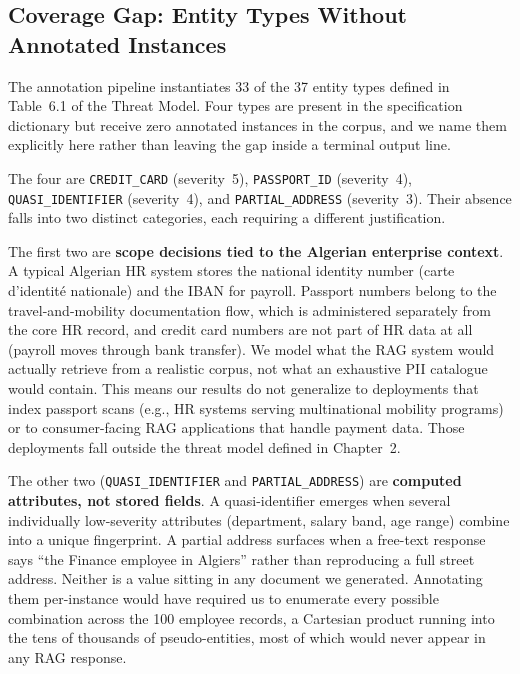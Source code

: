 \documentclass[12pt, a4paper]{report}
\begin{document}
\subsection{Coverage Gap: Entity Types Without Annotated Instances}
\label{subsec:coverage-gap}

The annotation pipeline instantiates 33 of the 37 entity types defined in Table~6.1 of the Threat Model. Four types are present in the specification dictionary but receive zero annotated instances in the corpus, and we name them explicitly here rather than leaving the gap inside a terminal output line.

The four are \texttt{CREDIT\_CARD} (severity~5), \texttt{PASSPORT\_ID} (severity~4), \texttt{QUASI\_IDENTIFIER} (severity~4), and \texttt{PARTIAL\_ADDRESS} (severity~3). Their absence falls into two distinct categories, each requiring a different justification.

The first two are \textbf{scope decisions tied to the Algerian enterprise context}. A typical Algerian HR system stores the national identity number (carte d'identité nationale) and the IBAN for payroll. Passport numbers belong to the travel-and-mobility documentation flow, which is administered separately from the core HR record, and credit card numbers are not part of HR data at all (payroll moves through bank transfer). We model what the RAG system would actually retrieve from a realistic corpus, not what an exhaustive PII catalogue would contain. This means our results do not generalize to deployments that index passport scans (e.g., HR systems serving multinational mobility programs) or to consumer-facing RAG applications that handle payment data. Those deployments fall outside the threat model defined in Chapter~2.

The other two (\texttt{QUASI\_IDENTIFIER} and \texttt{PARTIAL\_ADDRESS}) are \textbf{computed attributes, not stored fields}. A quasi-identifier emerges when several individually low-severity attributes (department, salary band, age range) combine into a unique fingerprint. A partial address surfaces when a free-text response says ``the Finance employee in Algiers'' rather than reproducing a full street address. Neither is a value sitting in any document we generated. Annotating them per-instance would have required us to enumerate every possible combination across the 100 employee records, a Cartesian product running into the tens of thousands of pseudo-entities, most of which would never appear in any RAG response.
\end{document}
